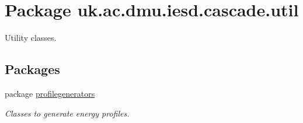 \hypertarget{namespaceuk_1_1ac_1_1dmu_1_1iesd_1_1cascade_1_1util}{\section{Package uk.\-ac.\-dmu.\-iesd.\-cascade.\-util}
\label{namespaceuk_1_1ac_1_1dmu_1_1iesd_1_1cascade_1_1util}
}


Utility classes.  


\subsection*{Packages}
\begin{DoxyCompactItemize}
\item 
package \hyperlink{namespaceuk_1_1ac_1_1dmu_1_1iesd_1_1cascade_1_1util_1_1profilegenerators}{profilegenerators}
\begin{DoxyCompactList}\small\item\em Classes to generate energy profiles. \end{DoxyCompactList}\end{DoxyCompactItemize}
